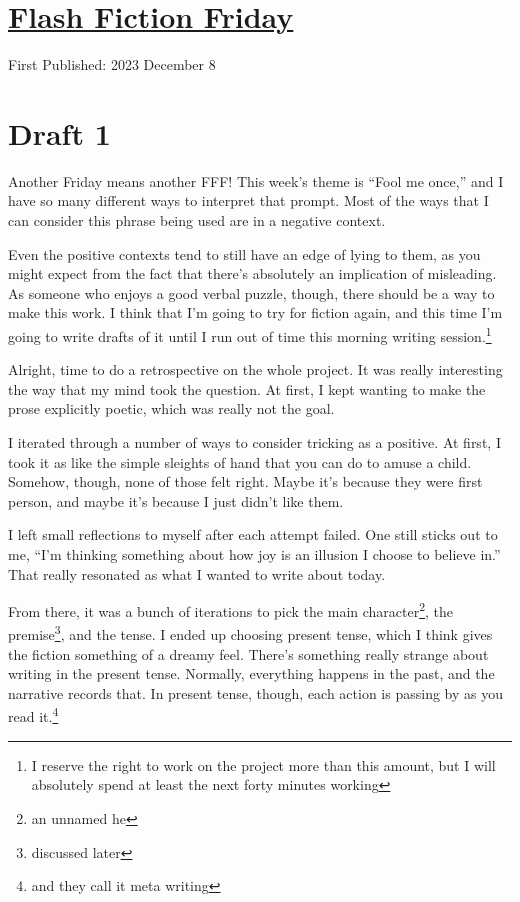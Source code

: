\documentclass[12pt]{article}[titlepage]
\newcommand{\say}[1]{``#1''}
\newcommand{\1}{\={a}}
\newcommand{\2}{\={e}}
\newcommand{\3}{\={\i}}
\newcommand{\4}{\=o}
\newcommand{\5}{\=u}
\newcommand{\6}{\={A}}
\renewcommand{\,}{\textsuperscript{,}}
\begin{document}
\doublespacing
\section{\href{flash-fiction-230.html}{Flash Fiction Friday}}
First Published: 2023 December 8

\section{Draft 1}
Another Friday means another FFF!
This week's theme is \say{Fool me once,} and I have so many different ways to interpret that prompt.
Most of the ways that I can consider this phrase being used are in a negative context.

Even the positive contexts tend to still have an edge of lying to them, as you might expect from the fact that there's absolutely an implication of misleading.
As someone who enjoys a good verbal puzzle, though, there should be a way to make this work.
I think that I'm going to try for fiction again, and this time I'm going to write drafts of it until I run out of time this morning writing session.\footnote{I reserve the right to work on the project more than this amount, but I will absolutely spend at least the next forty minutes working}

Alright, time to do a retrospective on the whole project.
It was really interesting the way that my mind took the question.
At first, I kept wanting to make the prose explicitly poetic, which was really not the goal.

I iterated through a number of ways to consider tricking as a positive.
At first, I took it as like the simple sleights of hand that you can do to amuse a child.
Somehow, though, none of those felt right.
Maybe it's because they were first person, and maybe it's because I just didn't like them.

I left small reflections to myself after each attempt failed.
One still sticks out to me, \say{I'm thinking something about how joy is an illusion I choose to believe in.}
That really resonated as what I wanted to write about today.

From there, it was a bunch of iterations to pick the main character\footnote{an unnamed he}, the premise\footnote{discussed later}, and the tense.
I ended up choosing present tense, which I think gives the fiction something of a dreamy feel.
There's something really strange about writing in the present tense.
Normally, everything happens in the past, and the narrative records that.
In present tense, though, each action is passing by as you read it.\footnote{and they call it meta writing}
\end{document}
